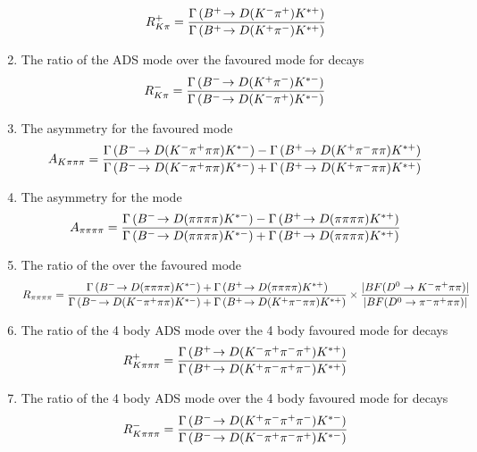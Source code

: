 \begin{enumerate}
{\begin{equation}
R^+_{K\pi} = \frac{\Gamma\left({{{B}^+}}\!\rightarrow {\ensuremath{D}}({{K}^-}{{\pi}^+}){{K}^{*+}}\right)}{\Gamma\left({{{B}^+}}\!\rightarrow {\ensuremath{D}}({{K}^+}{{\pi}^-}){{K}^{*+}}\right)}
\label{eqn:Rplus}
\end{equation}
}
\item{The ratio of the ADS mode over the favoured mode for \Bm decays
\begin{equation}
R^-_{K\pi} = \frac{\Gamma\left({{{B}^-}}\!\rightarrow {\ensuremath{D}}({{K}^+}{{\pi}^-}){{K}^{*-}}\right)}{\Gamma\left({{{B}^-}}\!\rightarrow {\ensuremath{D}}({{K}^-}{{\pi}^+}){{K}^{*-}}\right)}
\label{eqn:Rminus}
\end{equation}
}
\item{The \CP asymmetry for the favoured \decay{\Dz}{\Km\pip\pim\pip} mode
\begin{equation}
A_{{K}\pi\pi\pi} = \frac{\Gamma\left({{{B}^-}}\!\rightarrow {\ensuremath{D}}({{K}^-}{{\pi}^+}\pi\pi){{K}^{*-}}\right) - \Gamma\left({{{B}^+}}\!\rightarrow {\ensuremath{D}}({{K}^+}{{\pi}^-}\pi\pi){{K}^{*+}}\right)}{\Gamma\left({{{B}^-}}\!\rightarrow {\ensuremath{D}}({{K}^-}{{\pi}^+}\pi\pi){{K}^{*-}}\right) + \Gamma\left({{{B}^+}}\!\rightarrow {\ensuremath{D}}({{K}^+}{{\pi}^-}\pi\pi){{K}^{*+}}\right)}
\label{eqn:Akpipipi}
\end{equation}
}
\item{The \CP asymmetry for the \decay{\D}{\pip\pim\pip\pim} mode
\begin{equation}
A_{\pi\pi\pi\pi} = \frac{\Gamma\left({{{B}^-}}\!\rightarrow {\ensuremath{D}}(\pi\pi\pi\pi){{K}^{*-}}\right) - \Gamma\left({{{B}^+}}\!\rightarrow {\ensuremath{D}}(\pi\pi\pi\pi){{K}^{*+}}\right)}{\Gamma\left({{{B}^-}}\!\rightarrow {\ensuremath{D}}(\pi\pi\pi\pi){{K}^{*-}}\right) + \Gamma\left({{{B}^+}}\!\rightarrow {\ensuremath{D}}(\pi\pi\pi\pi){{K}^{*+}}\right)}
\label{eqn:Apipipipi}
\end{equation}
}
\item{The ratio of the \decay{\D}{\pip\pim\pip\pim} over the favoured mode
{\footnotesize
\begin{equation}
R_{\pi\pi\pi\pi} = \frac{\Gamma\left({{{B}^-}}\!\rightarrow {\ensuremath{D}}(\pi\pi\pi\pi){{K}^{*-}}\right) + \Gamma\left({{{B}^+}}\!\rightarrow {\ensuremath{D}}(\pi\pi\pi\pi){{K}^{*+}}\right)}{\Gamma\left({{{B}^-}}\!\rightarrow {\ensuremath{D}}({{K}^-}{{\pi}^+}\pi\pi){{K}^{*-}}\right) + \Gamma\left({{{B}^+}}\!\rightarrow {\ensuremath{D}}({{K}^+}{{\pi}^-}\pi\pi){{K}^{*+}}\right)} \times \frac{|BF(D^0 \rightarrow {\ensuremath{{K}^-}}{\ensuremath{{\pi}^+}}\pi\pi)|}{|BF(D^0 \rightarrow {\ensuremath{{\pi}^-}}{\ensuremath{{\pi}^+}}\pi\pi)|}
\label{eqn:Rpipipipi}
\end{equation}}
}
\item{The ratio of the 4 body ADS mode over the 4 body favoured mode for \Bp decays
\begin{equation}
R^+_{K\pi\pi\pi} = \frac{\Gamma\left({{{B}^+}}\!\rightarrow {\ensuremath{D}}({{K}^-}{{\pi}^+}{{\pi}^-}{{\pi}^+}){{K}^{*+}}\right)}{\Gamma\left({{{B}^+}}\!\rightarrow {\ensuremath{D}}({{K}^+}{{\pi}^-}{{\pi}^+}{{\pi}^-}){{K}^{*+}}\right)}
\label{eqn:Rplus4body}
\end{equation}
}
\item{The ratio of the 4 body ADS mode over the 4 body favoured mode for \Bm decays
\begin{equation}
R^-_{K\pi\pi\pi} = \frac{\Gamma\left({{{B}^-}}\!\rightarrow {\ensuremath{D}}({{K}^+}{{\pi}^-}{{\pi}^+}{{\pi}^-}){{K}^{*-}}\right)}{\Gamma\left({{{B}^-}}\!\rightarrow {\ensuremath{D}}({{K}^-}{{\pi}^+}{{\pi}^-}{{\pi}^+}){{K}^{*-}}\right)}
\label{eqn:Rminus4body}
\end{equation}
}
\end{enumerate}

